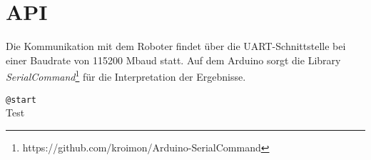 
\section{API}
Die Kommunikation mit dem Roboter findet über die UART-Schnittstelle bei einer Baudrate von 115200 Mbaud statt.
Auf dem Arduino sorgt die Library \emph{SerialCommand}\footnote{https://github.com/kroimon/Arduino-SerialCommand} für die Interpretation der Ergebnisse.

\begin{description}

\item \lstinline{@start} \\
Test

\end{description}

